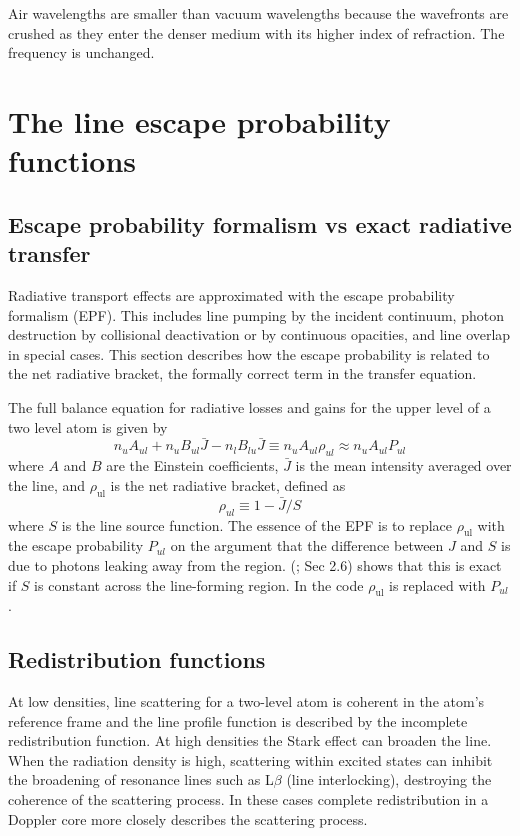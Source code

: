 Air wavelengths are smaller than vacuum wavelengths because the wavefronts
are crushed as they enter the denser medium with its higher index of
refraction.
The frequency is unchanged.

\section{The line escape probability functions }

\subsection{Escape probability formalism vs exact radiative transfer }

Radiative transport effects are approximated with the escape probability
formalism (EPF).  This includes line pumping by the incident continuum,
photon destruction by collisional deactivation or by continuous opacities,
and line overlap in special cases.  This section describes how the escape
probability is related to the net radiative bracket, the formally correct
term in the transfer equation.

The full balance equation for radiative losses and gains for the upper
level of a two level atom is given by
\begin{equation}
{n_u}{A_{ul}} + {n_u}{B_{ul}}\bar J - {n_l}{B_{lu}}\bar J \equiv
{n_u}{A_{ul}}{\rho _{ul}} \approx {n_u}{A_{ul}}{P_{ul}}%
\end{equation}
where $A$ and $B$ are the Einstein coefficients, $\bar J$
is the mean intensity averaged over the line,
and $\rho_{\mathrm{ul}}$ is the net radiative bracket, defined as
\begin{equation}
{\rho _{ul}} \equiv 1 - \bar J/S%
\end{equation}
where $S$ is the line source function.
The essence of the EPF is to replace
$\rho_{\mathrm{ul}}$ with the escape probability $P_{ul}$ on the argument that the difference
between $J$ and $S$ is due to photons leaking away from the region.  (\citealp{Elitzur1983}; Sec 2.6) shows that this is exact
if $S$ is constant across the
line-forming region.
In the code $\rho_{\mathrm{ul}}$ is replaced with $P_{ul}$.

\subsection{Redistribution functions }

At low densities, line scattering for a two-level atom is coherent in
the atom's reference frame and the line profile function is described by
the incomplete redistribution function.
At high densities the Stark effect
can broaden the line.
When the radiation density is high, scattering within
excited states can inhibit the broadening of resonance lines such as
L$\beta$ (line
interlocking), destroying the coherence of the scattering process.
In these
cases complete redistribution in a Doppler core more closely describes the
scattering process.

